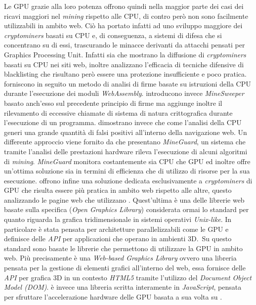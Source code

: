\documentclass[
11pt, %
oneside, %
italian, %
onehalfspacing,%
headsepline, %
]{MastersDoctoralThesis} %
\newcommand\citen[1]{\citeauthor{#1} \citep{#1}}
\newcommand\citetitlen[1]{\citetitle{#1} \citep{#1}}
\begin{document}
Le GPU grazie alla loro potenza offrono quindi nella maggior parte dei casi dei ricavi maggiori nel \emph{mining} rispetto alle CPU, di contro però non sono facilmente utilizzabili in ambito web. Ciò ha portato infatti ad uno sviluppo maggiore dei \emph{cryptominers} basati su CPU e, di conseguenza, a sistemi di difesa che si concentrano su di essi, trascurando le minacce derivanti da attacchi pensati per Graphics Processing Unit. Infatti sia \citen{musch2018web} che \citen{saad2018end} mostrano la diffusione di \emph{cryptominers} basati su CPU nei siti web, inoltre analizzano l'efficacia di tecniche difensive di blacklisting che risultano però essere una protezione insufficiente e poco pratica. \citen{wang2018seismic} forniscono in seguito un metodo di analisi di firme basate su istruzioni della CPU durante l'esecuzione dei moduli \emph{WebAssembly}. \citen{konoth2018minesweeper} introducono invece \emph{MineSweeper} basato anch'esso sul precedente principio di firme ma aggiunge inoltre il rilevamento di eccessive chiamate di sistema di natura crittografica durante l'esecuzione di un programma. \citen{kharraz2019outguard} dimostrano invece che come l'analisi della CPU generi una grande quantità di falsi positivi all'interno della navigazione web. Un differente approccio viene fornito da \citen{tahir2017mining} che presentano \emph{MineGuard}, un sistema che tramite l'analisi delle prestazioni hardware rileva l'esecuzione di alcuni algoritmi di \emph{mining}. \emph{MineGuard} monitora costantemente sia CPU che GPU ed inoltre offre un'ottima soluzione sia in termini di efficienza che di utilizzo di risorse per la sua esecuzione. \citen{belkin2019risks} offrono infine una soluzione dedicata esclusivamente a \emph{cryptominers} di GPU che risulta essere più pratica in ambito web rispetto alle altre, questo analizzando le pagine web che utilizzano \citetitlen{WebGL}. Quest'ultima è una delle librerie web basate sulla specifica  (\emph{Open Graphics Library}) considerata ormai lo standard per quanto riguarda la grafica tridimensionale in sistemi operativi \emph{Unix-like}. In particolare  è stata pensata per architetture parallelizzabili come le GPU e definisce delle \emph{API} per applicazioni che operano in ambienti 3D.\ Su questo standard sono basate le librerie che permettono di utilizzare la GPU in ambito web. Più precisamente  è una \emph{Web-based Graphics Library} ovvero una libreria pensata per la gestione di elementi grafici all'interno del web, essa fornisce delle \emph{API} per grafica 3D in un contesto \emph{HTML5} tramite l'utilizzo del \emph{Document Object Model (DOM)}.  è invece una libreria scritta interamente in \emph{JavaScript}, pensata per sfruttare l'accelerazione hardware delle GPU basata a sua volta su .\\
\end{document}
